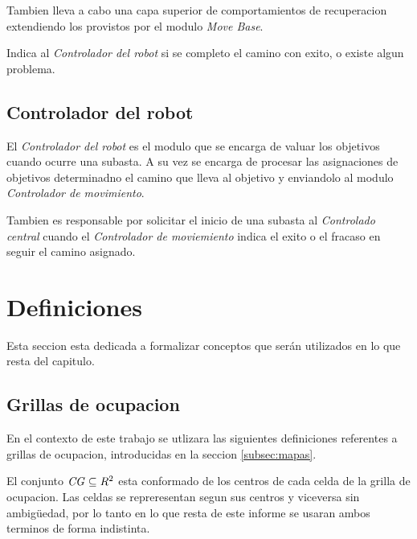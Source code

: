 Tambien lleva a cabo una capa superior de comportamientos de recuperacion
extendiendo los provistos por el modulo \emph{Move Base}.

Indica al \emph{Controlador del robot} si se completo el camino con exito, o
existe algun problema.

\subsection{Controlador del robot}
El \emph{Controlador del robot} es el modulo que se encarga de valuar los
objetivos cuando ocurre una subasta. A su vez se encarga de procesar las
asignaciones de objetivos determinadno el camino que lleva al objetivo y
enviandolo al modulo \emph{Controlador de movimiento}. 

Tambien es responsable por solicitar el inicio de una subasta al
\emph{Controlado central} cuando el \emph{Controlador de moviemiento} indica el
exito o el fracaso en seguir el camino asignado.



\section{Definiciones}
Esta seccion esta dedicada a formalizar conceptos que serán utilizados en lo que resta
del capitulo.

\subsection{Grillas de ocupacion}\label{subsec:Grilla}
En el contexto de este trabajo se utlizara las siguientes definiciones referentes a
grillas de ocupacion, introducidas en la seccion \ref{subsec:mapas}.

El conjunto $\mathit{CG}\subseteq R^2$ esta conformado de los centros de cada celda de la
grilla de ocupacion. Las celdas se repreresentan segun sus centros y viceversa
sin ambigüedad, por lo tanto en lo que resta de este informe se usaran ambos
terminos de forma indistinta.


